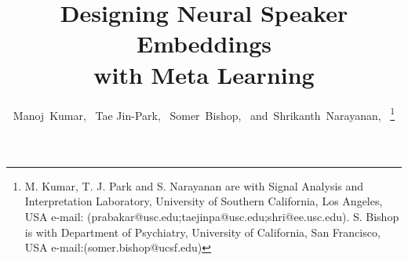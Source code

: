 \documentclass[journal]{IEEEtran}
\begin{document}
\title{Designing Neural Speaker Embeddings \\ with Meta Learning}


\author{Manoj~Kumar,~
        Tae Jin-Park,~
        Somer~Bishop,~\IEEEmembership{}
        and~Shrikanth~Narayanan,~%
\thanks{M. Kumar, T. J. Park and S. Narayanan are with Signal Analysis and Interpretation Laboratory, University of Southern California, Los Angeles, USA e-mail: (prabakar@usc.edu;taejinpa@usc.edu;shri@ee.usc.edu).
S. Bishop is with Department of Psychiatry, University of California, San
Francisco, USA e-mail:(somer.bishop@ucsf.edu)}
}


\maketitle
\end{document}
